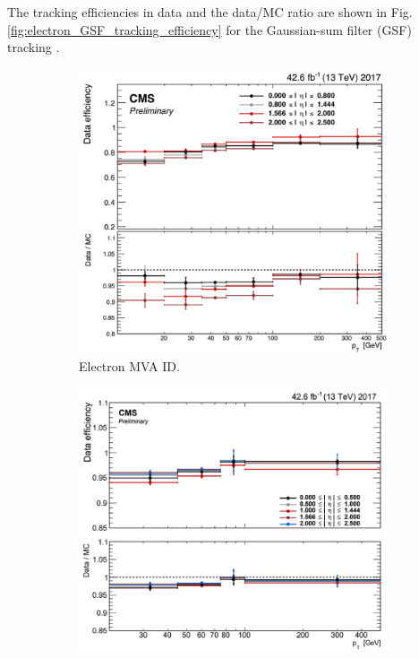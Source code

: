 The tracking efficiencies in data and the data/MC ratio are shown in Fig. \ref{fig:electron_GSF_tracking_efficiency} for the Gaussian-sum filter (GSF) tracking \cite{CMS-DP-2020-037}. 

\begin{figure}[h]
    \centering
    \begin{subfigure}{0.45\textwidth}
        \includegraphics[width=1.0\textwidth]{figures/ch-8-scale-factors-and-corrections/electron_MVA_90wp_identification_efficiency}
        \caption{Electron MVA ID.}
        \label{fig:electron_MVA_ID_efficiency}
    \end{subfigure}
    \hfill
    \begin{subfigure}{0.45\textwidth}
        \includegraphics[width=1.0\textwidth]{figures/ch-8-scale-factors-and-corrections/electron_gsf_tracking_efficiency}

\end{subfigure}
\end{figure}
